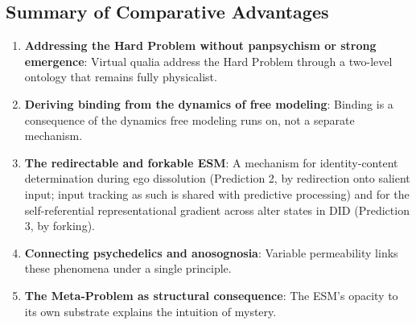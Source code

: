 \documentclass[12pt]{article}
\begin{document}
\subsection{Summary of Comparative Advantages}


\begin{enumerate}
\item \textbf{Addressing the Hard Problem without panpsychism or strong emergence}: Virtual qualia address the Hard Problem through a two-level ontology that remains fully physicalist.
\item \textbf{Deriving binding from the dynamics of free modeling}: Binding is a consequence of the dynamics free modeling runs on, not a separate mechanism.
\item \textbf{The redirectable and forkable ESM}: A mechanism for identity-content determination during ego dissolution (Prediction 2, by redirection onto salient input; input tracking as such is shared with predictive processing) and for the self-referential representational gradient across alter states in DID (Prediction 3, by forking).
\item \textbf{Connecting psychedelics and anosognosia}: Variable permeability links these phenomena under a single principle.
\item \textbf{The Meta-Problem as structural consequence}: The ESM's opacity to its own substrate explains the intuition of mystery.
\end{enumerate}
\end{document}

